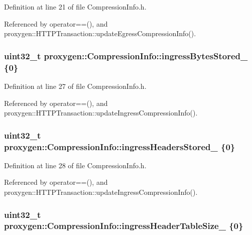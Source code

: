 Definition at line 21 of file Compression\+Info.\+h.



Referenced by operator==(), and proxygen\+::\+H\+T\+T\+P\+Transaction\+::update\+Egress\+Compression\+Info().

\subsubsection[{ingress\+Bytes\+Stored\+\_\+}]{\setlength{\rightskip}{0pt plus 5cm}uint32\+\_\+t proxygen\+::\+Compression\+Info\+::ingress\+Bytes\+Stored\+\_\+ \{0\}}\label{structproxygen_1_1CompressionInfo_afca67204c598e7b76e4c889a2fc7cd97}


Definition at line 27 of file Compression\+Info.\+h.



Referenced by operator==(), and proxygen\+::\+H\+T\+T\+P\+Transaction\+::update\+Ingress\+Compression\+Info().

\subsubsection[{ingress\+Headers\+Stored\+\_\+}]{\setlength{\rightskip}{0pt plus 5cm}uint32\+\_\+t proxygen\+::\+Compression\+Info\+::ingress\+Headers\+Stored\+\_\+ \{0\}}\label{structproxygen_1_1CompressionInfo_a680906edd9c2081d55c6df98db652dbb}


Definition at line 28 of file Compression\+Info.\+h.



Referenced by operator==(), and proxygen\+::\+H\+T\+T\+P\+Transaction\+::update\+Ingress\+Compression\+Info().

\subsubsection[{ingress\+Header\+Table\+Size\+\_\+}]{\setlength{\rightskip}{0pt plus 5cm}uint32\+\_\+t proxygen\+::\+Compression\+Info\+::ingress\+Header\+Table\+Size\+\_\+ \{0\}}\label{structproxygen_1_1CompressionInfo_adbf738f1a934cdfe112a41c883bfa5e4}


